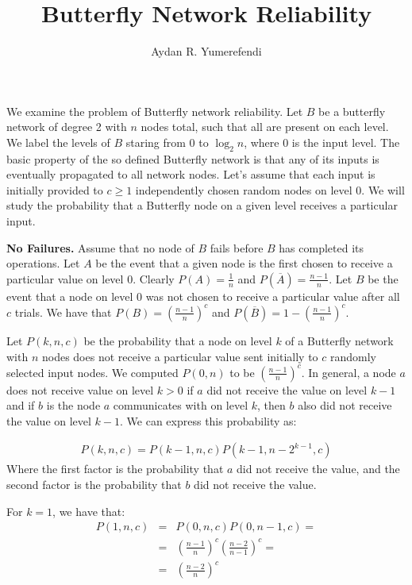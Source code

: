 \documentclass[10pt]{style}
\title {Butterfly Network Reliability}
\author {Aydan R. Yumerefendi}
\theoremstyle{plain}
\theoremstyle{definition}
\theoremstyle{remark}
\numberwithin{equation}{section}
\begin{document}
  \maketitle

  We examine the problem of Butterfly network
  reliability. Let $B$ be a butterfly network of degree 2 with $n$
  nodes total, such that all are present on each level.  We label the
  levels of $B$ staring from 0 to $\log_2n$, where 0 is the input
  level. The basic property of the  so defined Butterfly network is
  that any of its inputs is eventually propagated 
  to all network nodes. Let's assume that each input is initially provided
  to $c \geq 1$ independently chosen random nodes on level 0. We will
  study the probability that a Butterfly node on a given level
  receives a particular input.

  {\bf No Failures.} Assume that no node of $B$ fails before $B$ has
  completed its operations. Let $A$ be the event that a given node is
  the first chosen to receive a particular value on level 0. Clearly $P(A) =
  \frac{1}{n}$ and $P(\overline{A}) = \frac{n-1}{n}$. Let $B$ be the
  event that a node on level 0 was not chosen to receive a particular
  value after all $c$ trials. We have that $P(B) =
  (\frac{n-1}{n})^c$ and $P(\overline{B}) = 1-(\frac{n-1}{n})^c$.

  Let $P(k,n,c)$ be the probability that a node on level $k$ of a
  Butterfly network with $n$ nodes does not
  receive a particular value sent initially to $c$ randomly selected
  input nodes. We computed $P(0,n)$ to be $(\frac{n-1}{n})^c$. In
  general, a node $a$ does not receive value on level $k  > 0$ if $a$
  did not receive the value on level $k-1$ and if $b$ is the node $a$
  communicates with on level $k$, then $b$ also did not receive the
  value on level $k-1$. We can express this probability as: 

  \begin{eqnarray*}
    P(k,n,c) = P(k-1,n,c)P(k-1, n-2^{k-1},c)
  \end{eqnarray*}
  Where the first factor is the probability that $a$ did not receive
  the value, and the second factor is the probability that $b$ did not
  receive the value.

  For $k =1$, we have that:
  \begin{eqnarray*}
    P(1, n,c) &=& P(0, n,c)P(0, n-1,c) = \\
    &=&(\frac{n-1}{n})^c(\frac{n-2}{n-1})^c=\\
    &=&(\frac{n-2}{n})^c
  \end{eqnarray*}
\end{document}
